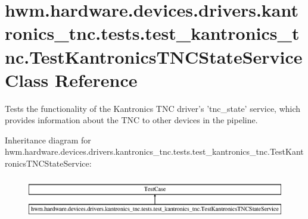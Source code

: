 \hypertarget{classhwm_1_1hardware_1_1devices_1_1drivers_1_1kantronics__tnc_1_1tests_1_1test__kantronics__tnc_0c24dcd59df096de940a284b07dc7d74}{\section{hwm.\-hardware.\-devices.\-drivers.\-kantronics\-\_\-tnc.\-tests.\-test\-\_\-kantronics\-\_\-tnc.\-Test\-Kantronics\-T\-N\-C\-State\-Service Class Reference}
\label{classhwm_1_1hardware_1_1devices_1_1drivers_1_1kantronics__tnc_1_1tests_1_1test__kantronics__tnc_0c24dcd59df096de940a284b07dc7d74}
}


Tests the functionality of the Kantronics T\-N\-C driver's 'tnc\-\_\-state' service, which provides information about the T\-N\-C to other devices in the pipeline.  


Inheritance diagram for hwm.\-hardware.\-devices.\-drivers.\-kantronics\-\_\-tnc.\-tests.\-test\-\_\-kantronics\-\_\-tnc.\-Test\-Kantronics\-T\-N\-C\-State\-Service\-:\begin{figure}[H]
\begin{center}
\leavevmode
\includegraphics[height=1.848185cm]{classhwm_1_1hardware_1_1devices_1_1drivers_1_1kantronics__tnc_1_1tests_1_1test__kantronics__tnc_0c24dcd59df096de940a284b07dc7d74}
\end{center}
\end{figure}

